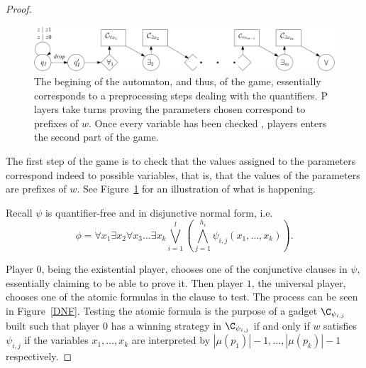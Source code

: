 \begin{proof}
\begin{center}
	\begin{figure}
		\hspace{-0.25cm}
\includegraphics[width=1.01\textwidth]{figures/quantifiers}
	\caption{The begining of the automaton, and thus, of the game, essentially corresponds to a preprocessing steps dealing with the quantifiers. P%
layers take turns %
	proving the parameters chosen correspond to prefixes of $w$. Once every variable has been checked%
	, players enters the second part of the game.}
		 \label{quantifiers}
	\end{figure}
\end{center}


The first step of the game is to check that the values assigned to the parameters correspond indeed to possible variables, that is, that the values of the parameters are prefixes of $w$. See Figure~\ref{quantifiers} for an illustration of what is happening.
%
%
%

Recall $\psi$ is quantifier-free and in disjunctive normal form, i.e.
 $$\phi = \forall x_1 \exists x_2 \forall x_3 \ldots \exists x_k \bigvee_{i=1}^l(\bigwedge_{j=1}^{h_i} \psi_{i,j}(x_1, \ldots, x_k)).$$

Player $0$, being the existential player, chooses one of the conjunctive clauses in $\psi$, essentially claiming to be able to prove it. Then player $1$, the universal player, chooses one of the atomic formulas in the clause to test. The process can be seen in Figure~\ref{DNF}. Testing the atomic formula is the purpose of a gadget $ \C_{\psi_{i,j}}$ built such that player $0$ has a winning strategy in $ \C_{\psi_{i,j}}$ if and only if 
$w$ satisfies $\psi_{i,j}$ if the variables $x_1, \ldots, x_k$ are interpreted by 
$ |\mu(p_1)|-1, \ldots, |\mu(p_k)|-1$ respectively.



\end{proof}

